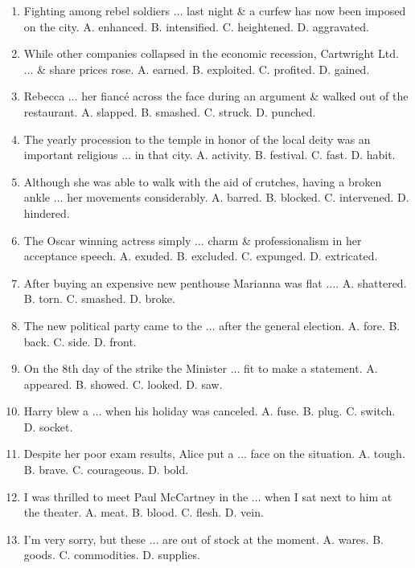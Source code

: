 \documentclass{article}
\numberwithin{equation}{section}
\begin{document}
\begin{enumerate}[leftmargin=2mm]
	\item Fighting among rebel soldiers $\ldots$ last night \& a curfew has now been imposed on the city. {\sf A.} enhanced. {\sf B.} intensified. {\sf C.} heightened. {\sf D.} aggravated.
	\item While other companies collapsed in the economic recession, Cartwright Ltd. $\ldots$ \& share prices rose. {\sf A.} earned. {\sf B.} exploited. {\sf C.} profited. {\sf D.} gained.
	\item Rebecca $\ldots$ her fianc\'e across the face during an argument \& walked out of the restaurant. {\sf A.} slapped. {\sf B.} smashed. {\sf C.} struck. {\sf D.} punched.
	\item The yearly procession to the temple in honor of the local deity was an important religious $\ldots$ in that city. {\sf A.} activity. {\sf B.} festival. {\sf C.} fast. {\sf D.} habit.
	\item Although she was able to walk with the aid of crutches, having a broken ankle $\ldots$ her movements considerably. {\sf A.} barred. {\sf B.} blocked. {\sf C.} intervened. {\sf D.} hindered.
	\item The Oscar winning actress simply $\ldots$ charm \& professionalism in her acceptance speech. {\sf A.} exuded. {\sf B.} excluded. {\sf C.} expunged. {\sf D.} extricated.
	\item After buying an expensive new penthouse Marianna was flat $\ldots$. {\sf A.} shattered. {\sf B.} torn. {\sf C.} smashed. {\sf D.} broke.
	\item The new political party came to the $\ldots$ after the general election. {\sf A.} fore. {\sf B.} back. {\sf C.} side. {\sf D.} front.
	\item On  the 8th day of the strike the Minister $\ldots$ fit to make a statement. {\sf A.} appeared. {\sf B.} showed. {\sf C.} looked. {\sf D.} saw.
	\item Harry blew a $\ldots$ when his holiday was canceled. {\sf A.} fuse. {\sf B.} plug. {\sf C.} switch. {\sf D.} socket.
	\item Despite her poor exam results, Alice put a $\ldots$ face on the situation. {\sf A.} tough. {\sf B.} brave. {\sf C.} courageous. {\sf D.} bold.
	\item I was thrilled to meet Paul McCartney in the $\ldots$ when I sat next to him at the theater. {\sf A.} meat. {\sf B.} blood. {\sf C.} flesh. {\sf D.} vein.
	\item I'm very sorry, but these $\ldots$ are out of stock at the moment. {\sf A.} wares. {\sf B.} goods. {\sf C.} commodities. {\sf D.} supplies.

\end{enumerate}
\end{document}

